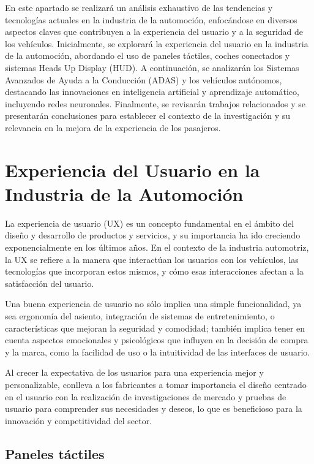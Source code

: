 \documentclass[12pt]{report} %
\begin{document}
En este apartado se realizará un análisis exhaustivo de las tendencias y tecnologías actuales en la industria de la automoción, enfocándose en diversos aspectos claves que contribuyen a la experiencia del usuario y a la seguridad de los vehículos. Inicialmente, se explorará la experiencia del usuario en la industria de la automoción, abordando el uso de paneles táctiles, coches conectados y sistemas Heads Up Display (HUD). A continuación, se analizarán los Sistemas Avanzados de Ayuda a la Conducción (ADAS) y los vehículos autónomos, destacando las innovaciones en inteligencia artificial y aprendizaje automático, incluyendo redes neuronales. Finalmente, se revisarán trabajos relacionados y se presentarán conclusiones para establecer el contexto de la investigación y su relevancia en la mejora de la experiencia de los pasajeros.

\section{Experiencia del Usuario en la Industria de la Automoción}

La experiencia de usuario (UX) es un concepto fundamental en el ámbito del diseño y desarrollo de productos y servicios, y su importancia ha ido creciendo exponencialmente en los últimos años. En el contexto de la industria automotriz, la UX se refiere a la manera que interactúan los usuarios con los vehículos, las tecnologías que incorporan estos mismos, y cómo esas interacciones afectan a la satisfacción del usuario.
\cite{userExperience}

Una buena experiencia de usuario no sólo implica una simple funcionalidad, ya sea ergonomía del asiento, integración de sistemas de entretenimiento, o características que mejoran la seguridad y comodidad; también implica tener en cuenta aspectos emocionales y psicológicos que influyen en la decisión de compra y la marca, como la facilidad de uso o la intuitividad de las interfaces de usuario. 

Al crecer la expectativa de los usuarios para una experiencia mejor y personalizable, conlleva a los fabricantes a tomar importancia el diseño centrado en el usuario con la realización de investigaciones de mercado y pruebas de usuario para comprender sus necesidades y deseos, lo que es beneficioso para la innovación y competitividad del sector. 

\subsection{Paneles táctiles}
\end{document}
